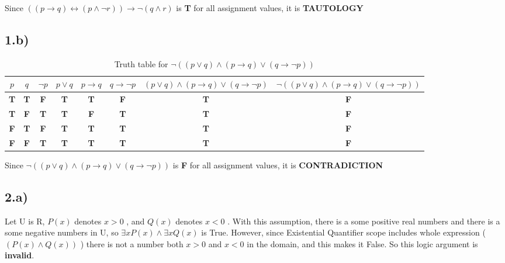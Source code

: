 \documentclass[12pt]{article}
\begin{document}
Since $((p \to q)\leftrightarrow(p \land \neg r)) \to \neg(q \land r)$ is \textbf{T} for all assignment values, it is \textbf{TAUTOLOGY}

\subsection*{1.b)}

\begin{table}[H]
\small
\centering
\caption{ Truth table for $\neg((p \lor q) \land (p \to q) \lor (q \to \neg p)) $  }
\label{table:example}
\begin{tabular}{|c|c|c|c|c|c|c|c|}	%
\hline 							%
\textbf{$p$} & \textbf{$q$} & \textbf{$\neg p$} & \textbf{$p \lor q$} & \textbf{$p \to q$} & \textbf{$q \to \neg p $} & \textbf{$(p \lor q) \land (p \to q) \lor (q \to \neg p)$} & \textbf{$\neg((p \lor q) \land (p \to q) \lor (q \to \neg p))$} \\
\hline 
\hline
\textbf{T} & \textbf{T} & \textbf{F} & \textbf{T} & \textbf{T} & \textbf{F} & \textbf{T} & \textbf{F}   \\	
\hline
\textbf{T} & \textbf{F} &\textbf{T} & \textbf{T} & \textbf{F} & \textbf{T} & \textbf{T} & \textbf{F}   \\
\hline
\textbf{F} & \textbf{T} & \textbf{F} & \textbf{T} & \textbf{T} & \textbf{T} & \textbf{T} & \textbf{F}   \\
\hline
\textbf{F} & \textbf{F} & \textbf{T} & \textbf{T} & \textbf{T} & \textbf{T} & \textbf{T} & \textbf{F}   \\
\hline

\end{tabular}
\end{table}

Since $\neg((p \lor q) \land (p \to q) \lor (q \to \neg p))$ is \textbf{F} for all assignment values, it is \textbf{CONTRADICTION}
\subsection*{2.a)}

Let U is R, $P(x)$ denotes $x > 0$ , and $Q(x)$ denotes $x < 0$ . With this assumption, there is a some positive real numbers and there is a some negative numbers in U, so $\exists xP(x) \land \exists xQ(x)$ is True. However, since Existential Quantifier scope includes whole expression ( $(P(x) \land Q(x))$ )  there is not a number both $x > 0$ and $x < 0$ in the domain, and this makes it False. So this logic argument is \textbf{invalid}.
\end{document}
